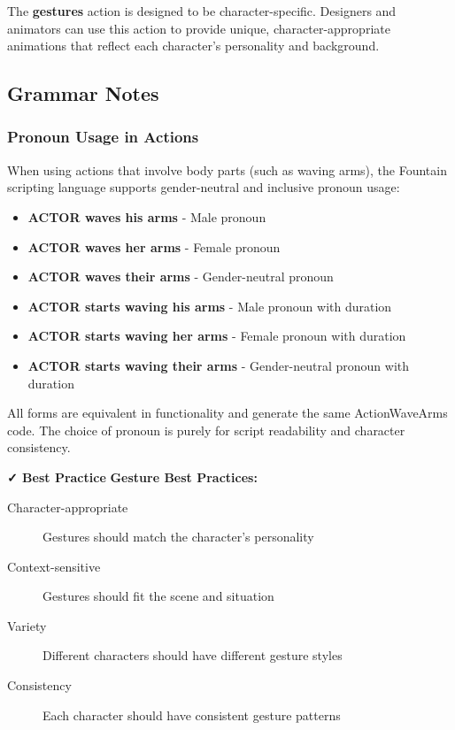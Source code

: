 \documentclass[11pt,letterpaper,oldstylefigures]{memoir}
\newenvironment{FountainExample}
  {\begingroup
  \ttfamily\small
   \setlength{\parindent}{0pt}
  \setlength{\parskip}{0.5em}
  \allowdisplaybreaks
  \setlength{\displaywidowpenalty}{0}
  \setlength{\widowpenalty}{0}
  \setlength{\clubpenalty}{0}
  \setlength{\interlinepenalty}{0}
}
  {\endgroup}
\newcommand{\fountain}[1]{\textbf{#1}}
\begin{document}
\begin{FountainExample}
The \fountain{gestures} action is designed to be character-specific. Designers and animators can use this action to provide unique, character-appropriate animations that reflect each character's personality and background.

\subsection{Grammar Notes}

\subsubsection{Pronoun Usage in Actions}

When using actions that involve body parts (such as waving arms), the Fountain scripting language supports gender-neutral and inclusive pronoun usage:

\begin{itemize}
\item \fountain{ACTOR waves his arms} - Male pronoun
\item \fountain{ACTOR waves her arms} - Female pronoun
\item \fountain{ACTOR waves their arms} - Gender-neutral pronoun
\item \fountain{ACTOR starts waving his arms} - Male pronoun with duration
\item \fountain{ACTOR starts waving her arms} - Female pronoun with duration
\item \fountain{ACTOR starts waving their arms} - Gender-neutral pronoun with duration
\end{itemize}

All forms are equivalent in functionality and generate the same ActionWaveArms code. The choice of pronoun is purely for script readability and character consistency.

\textbf{✓ Best Practice}
\textbf{Gesture Best Practices:}
\begin{description}
\item[Character-appropriate] Gestures should match the character's personality
\item[Context-sensitive] Gestures should fit the scene and situation
\item[Variety] Different characters should have different gesture styles
\item[Consistency] Each character should have consistent gesture patterns
\end{description}



\end{FountainExample}
\end{document}
